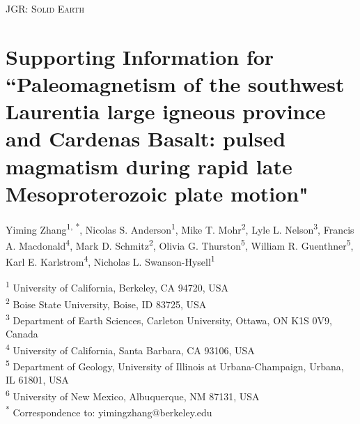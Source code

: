\documentclass[11pt,letterpaper]{article}
\begin{document}
\begin{center}
\textsc{JGR: Solid Earth}
\end{center}

\renewcommand{\thefigure}{S\arabic{figure}}
\renewcommand{\thetable}{S\arabic{table}}
\section*{Supporting Information for ``Paleomagnetism of the southwest Laurentia large igneous province and Cardenas Basalt: pulsed magmatism during rapid late Mesoproterozoic plate motion"}


Yiming Zhang\textsuperscript{1, *},
Nicolas S. Anderson\textsuperscript{1}, 
Mike T. Mohr\textsuperscript{2}, 
Lyle L. Nelson\textsuperscript{3}, 
Francis A. Macdonald\textsuperscript{4}, 
Mark D. Schmitz\textsuperscript{2}, 
Olivia G. Thurston\textsuperscript{5}, 
William R. Guenthner\textsuperscript{5},
Karl E. Karlstrom\textsuperscript{4},
Nicholas L. Swanson-Hysell\textsuperscript{1}


\begin{flushleft}
\bigskip
\textsuperscript{1} University of California, Berkeley, CA 94720, USA\\
\textsuperscript{2} Boise State University, Boise, ID 83725, USA\\
\textsuperscript{3} Department of Earth Sciences, Carleton University, Ottawa, ON K1S 0V9, Canada\\
\textsuperscript{4} University of California, Santa Barbara, CA 93106, USA\\
\textsuperscript{5} Department of Geology, University of Illinois at Urbana-Champaign, Urbana, IL 61801, USA\\
\textsuperscript{6} University of New Mexico, Albuquerque, NM 87131, USA\\
\textsuperscript{*} Correspondence to: yimingzhang@berkeley.edu \\
\end{flushleft}



\listoffigures
\listoftables
\end{document}
